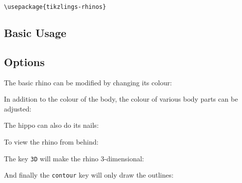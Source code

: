\documentclass[parskip=half]{scrartcl}
\begin{document}
\begin{tcolorbox}[lower separated=false, lefthand width=.8\linewidth]
\vspace*{0.5cm}
\lstinline|\usepackage{tikzlings-rhinos}| 
\vspace*{0.5cm}
\end{tcolorbox}

\subsection{Basic Usage}

\begin{tcblisting}{}
\rhino
\end{tcblisting}

\subsection{Options}

The basic rhino can be modified by changing its colour:
\begin{tcblisting}{}
\rhino[body=blue]
\end{tcblisting}

In addition to the colour of the body, the colour of various body parts can be adjusted:
\begin{tcblisting}{}
\rhino[eye=red]
\end{tcblisting}
\begin{tcblisting}{}
\rhino[pupil=red]
\end{tcblisting}
\begin{tcblisting}{}
\rhino[mouth=red]
\end{tcblisting}

The hippo can also do its nails:
\begin{tcblisting}{}
\rhino[toes=red]
\end{tcblisting}

To view the rhino from behind:
\begin{tcblisting}{}
\rhino[back]
\end{tcblisting}

The key \lstinline|3D| will make the rhino 3-dimensional:
\begin{tcblisting}{}
\rhino[3D]
\end{tcblisting}

And finally the \lstinline|contour| key will only draw the outlines:
\begin{tcblisting}{}
\rhino[contour=black]
\end{tcblisting}
\end{document}
